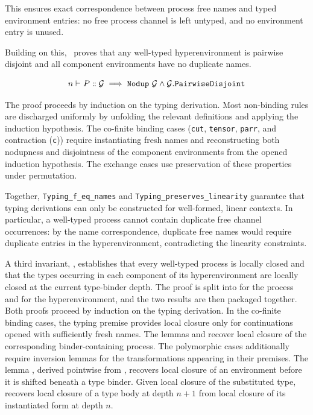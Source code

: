 This ensures exact correspondence between process free names and typed environment entries: no free process channel is left untyped, and no environment entry is unused.

Building on this,~ proves that 
any well-typed hyperenvironment is pairwise disjoint and all component 
environments have no duplicate names.

\begin{highlight}
\[
{{}n \vdash_{} P \mathrel{:\mspace{-1mu}:} \mathcal{G}} \implies 
\texttt{Nodup}~\mathcal{G} \land \mathcal{G}.\texttt{PairwiseDisjoint}
\]
\end{highlight}

The proof proceeds by induction on the typing derivation. Most non-binding rules are discharged uniformly by unfolding the relevant definitions and applying the induction hypothesis. The co-finite binding cases (\texttt{cut}, \texttt{tensor}, \texttt{parr}, and contraction (\texttt{c})) require instantiating fresh names and reconstructing both nodupness and disjointness of the component environments from the opened induction hypothesis. The exchange cases use preservation of these properties under permutation. 

Together, \texttt{Typing\_f\_eq\_names} and \texttt{Typing\_preserves\_linearity} guarantee that typing derivations can only be constructed for well-formed, linear contexts. In particular, a well-typed process cannot contain duplicate free channel occurrences: by the name correspondence, duplicate free names would require duplicate entries in the hyperenvironment, contradicting the linearity constraints. 

A third invariant, , establishes that every well-typed process is locally closed and that the types occurring in each component of its hyperenvironment are locally closed at the current type-binder depth. The proof is split into  for the process and  for the hyperenvironment, and the two results are then packaged together. Both proofs proceed by induction on the typing derivation. In the co-finite binding cases, the typing premise provides local closure only for continuations opened with sufficiently fresh names. The lemmas  and  recover local closure of the corresponding binder-containing process. The polymorphic cases additionally require inversion lemmas for the transformations appearing in their premises. The lemma , derived pointwise from , recovers local closure of an environment before it is shifted beneath a type binder. Given local closure of the substituted type,  recovers local closure of a type body at depth $n+1$ from local closure of its instantiated form at depth $n$.

